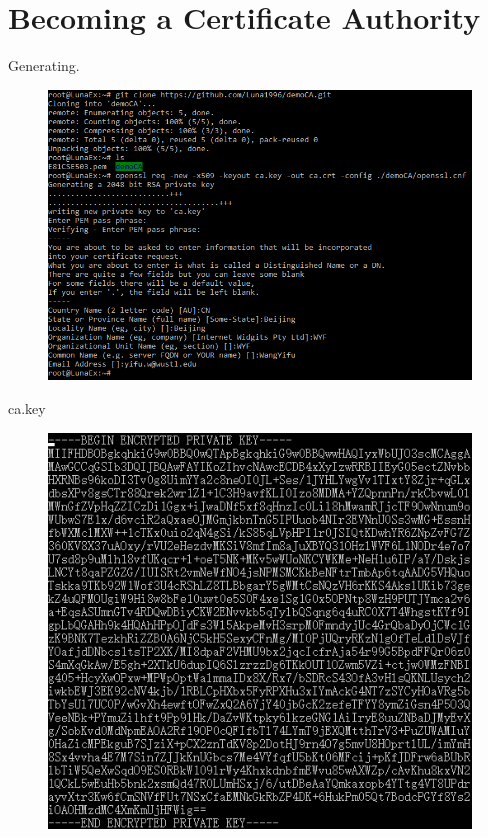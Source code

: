 \documentclass{article}
\begin{document}
\maketitle

\section{Becoming a Certificate Authority}
Generating.
\begin{figure}[H]\centering\includegraphics[width=\textwidth]{1-1.png}\end{figure}
ca.key
\begin{figure}[H]\centering\includegraphics{1-2.png}\end{figure}
\end{document}
